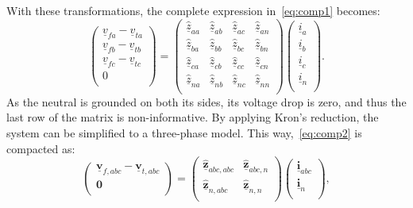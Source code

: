 \documentclass[11pt]{article}
\begin{document}
	With these transformations, the complete expression in~\eqref{eq:comp1} becomes:
	\begin{equation}
		\begin{pmatrix}
			\underline{v}_{fa} - \underline{v}_{ta} \\
			\underline{v}_{fb} - \underline{v}_{tb} \\
			\underline{v}_{fc} - \underline{v}_{tc} \\
			0 \\
		\end{pmatrix}
	= \begin{pmatrix}
		\underline{\hat{z}}_{aa} & \underline{\hat{z}}_{ab} & \underline{\hat{z}}_{ac} & \underline{\hat{z}}_{an} \\ 
		\underline{\hat{z}}_{ba} & \underline{\hat{z}}_{bb} & \underline{\hat{z}}_{bc} & \underline{\hat{z}}_{bn} \\
		\underline{\hat{z}}_{ca} & \underline{\hat{z}}_{cb} & \underline{\hat{z}}_{cc} & \underline{\hat{z}}_{cn} \\
		\underline{\hat{z}}_{na} & \underline{\hat{z}}_{nb} & \underline{\hat{z}}_{nc} & \underline{\hat{z}}_{nn} \\
	\end{pmatrix}
	\begin{pmatrix}
		\underline{i}_{a} \\
		\underline{i}_{b} \\
		\underline{i}_{c} \\
		\underline{i}_{n} \\
	\end{pmatrix}.
	\label{eq:comp2}
	\end{equation}
	As the neutral is grounded on both its sides, its voltage drop is zero, and thus the last row of the matrix is non-informative. By applying Kron's reduction, the system can be simplified to a three-phase model. This way,~\eqref{eq:comp2} is compacted as:
	\begin{equation}
		\begin{pmatrix}
			\underline{\bm{v}}_{f,abc} - \underline{\bm{v}}_{t,abc} \\
			\bm{0} \\
		\end{pmatrix}
		= \begin{pmatrix}
			\underline{\hat{\bm{z}}}_{abc,abc} & \underline{\hat{\bm{z}}}_{abc,n} \\
			\underline{\hat{\bm{z}}}_{n,abc} & \underline{\hat{\bm{z}}}_{n,n} \\
		\end{pmatrix}
		\begin{pmatrix}
			\underline{\bm{i}}_{abc} \\
			\underline{\bm{i}}_{n} \\
		\end{pmatrix},
		\label{eq:comp3}
	\end{equation}
\end{document}
